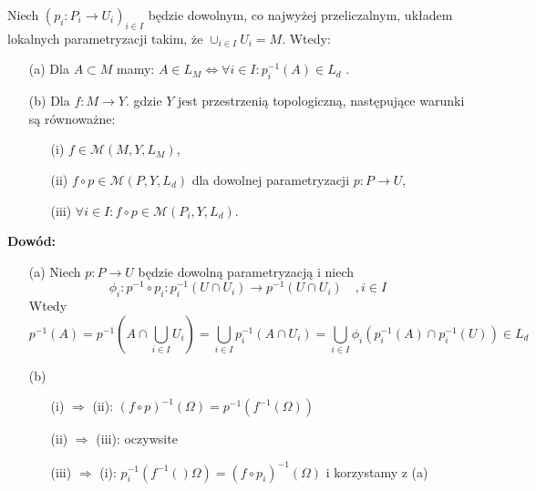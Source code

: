 \begin{tw}
	Niech $(p_i: P_i \rightarrow U_i)_{i \in I}$ będzie dowolnym, co najwyżej przeliczalnym, układem lokalnych parametryzacji takim, że $\cup_{i \in I} U_i = M$. Wtedy:
	\begin{enumerate}
		\item[(a)] Dla $A \subset M$ mamy: $A \in L_M \Leftrightarrow \forall i \in I: p_i^{-1}(A) \in L_d$ .
		\item[(b)] Dla $f: M \rightarrow Y$. gdzie $Y$ jest przestrzenią topologiczną, następujące warunki są równoważne:
			\begin{enumerate}
				\item[(i)] $f \in \mathcal{M}(M, Y, L_M)$,
				\item[(ii)] $f \circ p \in \mathcal{M}(P, Y, L_d)$ dla dowolnej parametryzacji $p: P \rightarrow U$,
				\item[(iii)] $\forall i \in I: f \circ p \in \mathcal{M}(P_i, Y, L_d)$.
			\end{enumerate}
	\end{enumerate}
	\textbf{Dowód:}
	\begin{enumerate}
		\item[(a)] Niech $p: P \rightarrow U$ będzie dowolną parametryzacją i niech 
		$$
			\phi_i: p^{-1} \circ p_i: p^{-1}_i(U \cap U_i) \rightarrow p^{-1}(U \cap U_i) \quad , i \in I
		$$
		Wtedy 
		$$
			p^{-1}(A) = p^{-1}(A \cap \bigcup_{i\in I} U_i) = \bigcup_{i \in I} p^{-1}_i(A \cap U_i) = \bigcup_{i \in I} \phi_i(p_i^{-1}(A) \cap p_i^{-1}(U)) \in L_d
		$$ 
		\item[(b)]
			\begin{enumerate} 
				\item[(i)] $\Longrightarrow$ (ii): $(f \circ p)^{-1}(\Omega) = p^{-1}(f^{-1}(\Omega))$ 
				\item[(ii)] $\Longrightarrow$ (iii): oczywsite
				\item[(iii)] $\Longrightarrow$ (i): $p_i^{-1}(f^{-1}()\Omega) = (f \circ p_i)^{-1}(\Omega)$ i korzystamy z (a)
			\end{enumerate}
	\end{enumerate}
\end{tw}